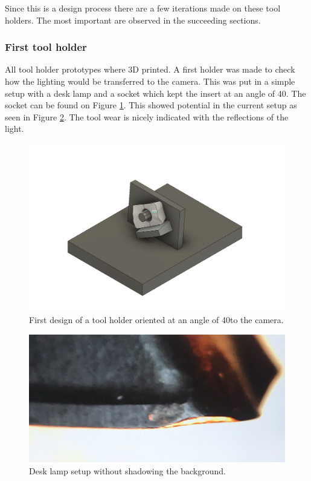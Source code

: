 	Since this is a design process there are a few iterations made on these tool holders. The most important are observed in the succeeding sections.
	
	
	\subsubsection{First tool holder}
	\label{sec:impl:camerasetup:firsttoolholder}
	All tool holder prototypes where 3D printed. A first holder was made to check how the lighting would be transferred to the camera. This was put in a simple setup with a desk lamp and a socket which kept the insert at an angle of 40\textdegree. The socket can be found on Figure \ref{fig:impl:setup:fth}. This showed potential in the current setup as seen in Figure \ref{fig:setup:desklamp:whitebg}. The tool wear is nicely indicated with the reflections of the light. 
	
	\begin{figure}[hbtp]
	\centering
	\includegraphics[scale=0.2]{fig/Camera_setup/Tool_Holder/simpeleHouder_attaached.png}
	\caption{First design of a tool holder oriented at an angle of 40\textdegree to the camera.}
	\label{fig:impl:setup:fth}
	\end{figure}
	
	
	\begin{figure}[hbtp]
		\centering
		\includegraphics[scale=0.2]{fig/Camera_setup/Light/Desk_Lamp_Test/desk_lamp_setup_whitebg.jpeg}
		\caption{Desk lamp setup without shadowing the background.}
		\label{fig:setup:desklamp:whitebg}
	\end{figure}
	

